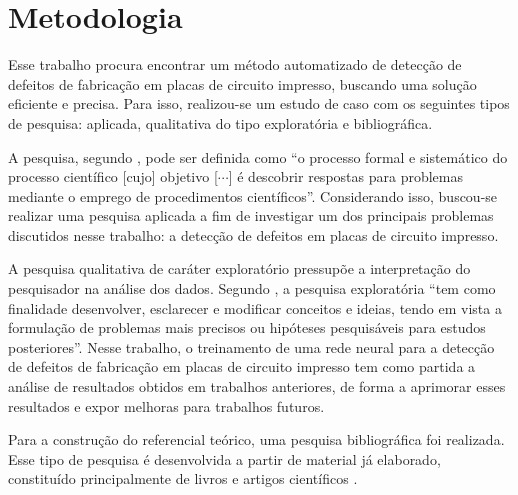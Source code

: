 \chapter{Metodologia}

Esse trabalho procura encontrar um método automatizado de detecção de defeitos de fabricação em placas de circuito impresso, buscando uma solução eficiente e precisa. Para isso, realizou-se um estudo de caso com os seguintes tipos de pesquisa: aplicada, qualitativa do tipo exploratória e bibliográfica.

A pesquisa, segundo , pode ser definida como ``o processo formal e sistemático do processo científico [cujo] objetivo [$\cdots$] é descobrir respostas para problemas mediante o emprego de procedimentos científicos''. Considerando isso, buscou-se realizar uma pesquisa aplicada a fim de investigar um dos principais problemas discutidos nesse trabalho: a detecção de defeitos em placas de circuito impresso.

A pesquisa qualitativa de caráter exploratório pressupõe a interpretação do pesquisador na análise dos dados. Segundo , a pesquisa exploratória ``tem como finalidade desenvolver, esclarecer e modificar conceitos e ideias, tendo em vista a formulação de problemas mais precisos ou hipóteses pesquisáveis para estudos posteriores''. Nesse trabalho, o treinamento de uma rede neural para a detecção de defeitos de fabricação em placas de circuito impresso tem como partida a análise de resultados obtidos em trabalhos anteriores, de forma a aprimorar esses resultados e expor melhoras para trabalhos futuros.

Para a construção do referencial teórico, uma pesquisa bibliográfica foi realizada. Esse tipo de pesquisa é desenvolvida a partir de material já elaborado, constituído principalmente de livros e artigos científicos \cite{ref:Gil}.
